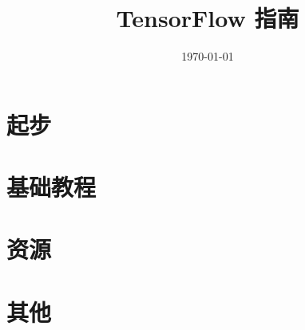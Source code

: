 \documentclass[a4paper,11pt,twoside]{ctexbook}
\title{TensorFlow 指南}
\author{}
\date{\today}
\begin{document}
\maketitle
\tableofcontents

\newpage
\chapter{起步}




\newpage
\chapter{基础教程}







\newpage



\newpage
\chapter{资源}

\newpage
\chapter{其他}
\end{document}
